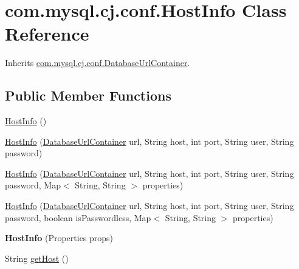 \hypertarget{classcom_1_1mysql_1_1cj_1_1conf_1_1_host_info}{}\section{com.\+mysql.\+cj.\+conf.\+Host\+Info Class Reference}
\label{classcom_1_1mysql_1_1cj_1_1conf_1_1_host_info}


Inherits \mbox{\hyperlink{interfacecom_1_1mysql_1_1cj_1_1conf_1_1_database_url_container}{com.\+mysql.\+cj.\+conf.\+Database\+Url\+Container}}.

\subsection*{Public Member Functions}
\begin{DoxyCompactItemize}
\item 
\mbox{\hyperlink{classcom_1_1mysql_1_1cj_1_1conf_1_1_host_info_a4560d8ddc8f66b75d4285b0bb1e3a2c0}{Host\+Info}} ()
\item 
\mbox{\hyperlink{classcom_1_1mysql_1_1cj_1_1conf_1_1_host_info_abf279f3212ad1fe272189757ef090d90}{Host\+Info}} (\mbox{\hyperlink{interfacecom_1_1mysql_1_1cj_1_1conf_1_1_database_url_container}{Database\+Url\+Container}} url, String host, int port, String user, String password)
\item 
\mbox{\hyperlink{classcom_1_1mysql_1_1cj_1_1conf_1_1_host_info_a8a1fe5f76612d02152c4c8256adf5a01}{Host\+Info}} (\mbox{\hyperlink{interfacecom_1_1mysql_1_1cj_1_1conf_1_1_database_url_container}{Database\+Url\+Container}} url, String host, int port, String user, String password, Map$<$ String, String $>$ properties)
\item 
\mbox{\hyperlink{classcom_1_1mysql_1_1cj_1_1conf_1_1_host_info_a0fcc1bf37adac929b5b66642f535beff}{Host\+Info}} (\mbox{\hyperlink{interfacecom_1_1mysql_1_1cj_1_1conf_1_1_database_url_container}{Database\+Url\+Container}} url, String host, int port, String user, String password, boolean is\+Passwordless, Map$<$ String, String $>$ properties)
\item 
\mbox{\label{classcom_1_1mysql_1_1cj_1_1conf_1_1_host_info_a9fe0d4cd94cfc72b8fdb56ac6f72a810}} 
{\bfseries Host\+Info} (Properties props)
\item 
String \mbox{\hyperlink{classcom_1_1mysql_1_1cj_1_1conf_1_1_host_info_acae50ff394b02e8a7c6874b8d00d48f5}{get\+Host}} ()
\item 

\end{DoxyCompactItemize}

